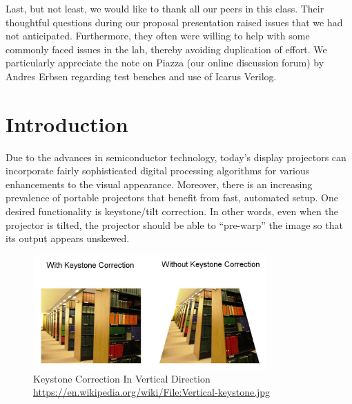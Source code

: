 \documentclass{article}
\begin{document}
Last, but not least, we would like to thank all our peers in this class.
Their thoughtful questions during our proposal presentation raised issues that we had not anticipated.
Furthermore, they often were willing to help with some commonly faced issues in the lab, thereby avoiding duplication of effort.
We particularly appreciate the note on Piazza (our online discussion forum) by Andres Erbsen regarding test benches and use of Icarus Verilog.
\newpage

\tableofcontents
\newpage

\section{Introduction}
Due to the advances in semiconductor technology,
today's display projectors can incorporate fairly sophisticated digital processing algorithms for various enhancements to the visual appearance.
Moreover, there is an increasing prevalence of portable projectors that benefit from fast, automated setup.
One desired functionality is keystone/tilt correction.
In other words, even when the projector is tilted, the projector should be able to ``pre-warp'' the image so that its output appears unskewed.
\begin{center}
\begin{figure}[h!]
    \caption{Keystone Correction In Vertical Direction \url{https://en.wikipedia.org/wiki/File:Vertical-keystone.jpg}}
\includegraphics[width=0.8\textwidth]{./img/keystone}
\end{figure}
\end{center}
\end{document}
